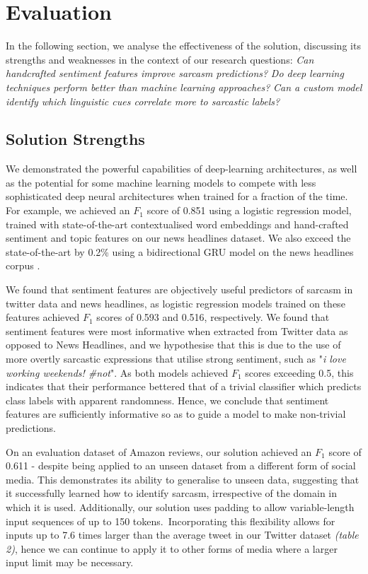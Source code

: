 \documentclass[12pt,a4paper]{article}
\begin{document}
\section{Evaluation}
\noindent In the following section, we analyse the effectiveness of the solution, discussing its strengths and weaknesses in the context of our research questions: \textit{Can handcrafted sentiment features improve sarcasm predictions?} \textit{Do deep learning techniques perform better than machine learning approaches?} \textit{Can a custom model identify which linguistic cues correlate more to sarcastic labels?}\\\vspace{-10pt}

\subsection{Solution Strengths}\vspace{-10pt}
\noindent We demonstrated the powerful capabilities of deep-learning architectures, as well as the potential for some machine learning models to compete with less sophisticated deep neural architectures when trained for a fraction of the time. For example, we achieved an $F_1$ score of 0.851 using a logistic regression model, trained with state-of-the-art contextualised word embeddings and hand-crafted sentiment and topic features on our news headlines dataset. We also exceed the state-of-the-art by 0.2\% using a bidirectional GRU model on the news headlines corpus \cite{misra2019sarcasm}.

We found that sentiment features are objectively useful predictors of sarcasm in twitter data and news headlines, as logistic regression models trained on these features achieved $F_1$ scores of 0.593 and 0.516, respectively. We found that sentiment features were most informative when extracted from Twitter data as opposed to News Headlines, and we hypothesise that this is due to the use of more overtly sarcastic expressions that utilise strong sentiment, such as "\textit{i love working weekends! \#not}". As both models achieved $F_1$ scores exceeding 0.5, this indicates that their performance bettered that of a trivial classifier which predicts class labels with apparent randomness. Hence, we conclude that sentiment features are sufficiently informative so as to guide a model to make non-trivial predictions.

On an evaluation dataset of Amazon reviews, our solution achieved an $F_1$ score of 0.611 - despite being applied to an unseen dataset from a different form of social media. This demonstrates its ability to generalise to unseen data, suggesting that it successfully learned how to identify sarcasm, irrespective of the domain in which it is used. Additionally, our solution uses padding to allow variable-length input sequences of up to 150 tokens.\ Incorporating this flexibility allows for inputs up to 7.6 times larger than the average tweet in our Twitter dataset \textit{(table 2)}, hence we can continue to apply it to other forms of media where a larger input limit may be necessary.
\end{document}
